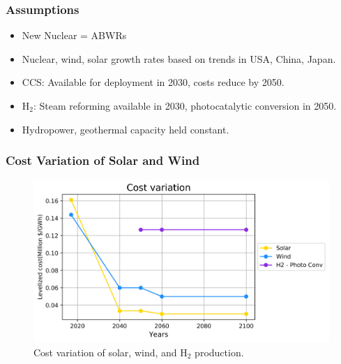 \begin{frame}
  \frametitle{Assumptions}

  \begin{itemize}
  
  \item New Nuclear = ABWRs
  
  \item Nuclear, wind, solar growth rates based on trends in USA, China, Japan.
  
  \item CCS: Available for deployment in 2030, costs reduce by 2050.
  
  \item H$_2$: Steam reforming available in 2030, photocatalytic conversion in 2050.
  
  \item Hydropower, geothermal capacity held constant.
  
  \end{itemize}

\end{frame}


\begin{frame}
  \frametitle{Cost Variation of Solar and Wind}
  \begin{figure}[htbp!]
    \begin{center}
      \includegraphics[scale=0.6]{./images/cost}
    \end{center}
          \caption{Cost variation of solar, wind, and H$_2$ production.}
    \label{cost}
  \end{figure}
\end{frame}
